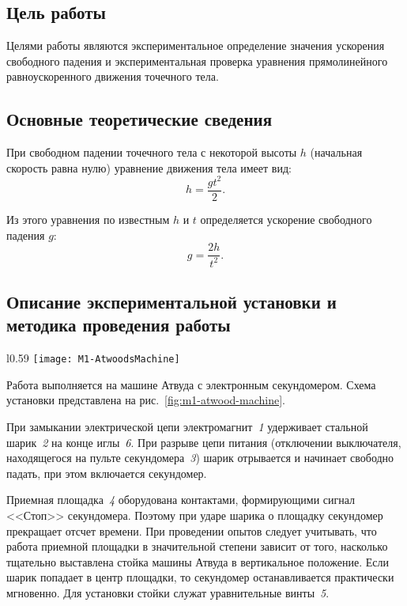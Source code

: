\documentclass[a4paper, 12pt]{extarticle}
\begin{document}
\MTDTitlePage
\MTDInfoPage

\setcounter{section}{1}

\subsection{Цель работы}
Целями работы являются экспериментальное определение значения ускорения свободного падения и экспериментальная проверка уравнения прямолинейного равноускоренного движения точечного тела.

\subsection{Основные теоретические сведения}
При свободном падении точечного тела с некоторой высоты $h$ (начальная скорость равна нулю) уравнение движения тела имеет вид: %
\begin{equation}
\label{eq:m1-free-fall-h}
h = \frac{gt^2}{2}.
\end{equation}

Из этого уравнения по известным $h$ и $t$ определяется ускорение свободного падения $g$: %
\begin{equation}
\label{eq:m1-free-fall-g}
g = \frac{2h}{t^2}.
\end{equation}

\subsection{Описание экспериментальной установки и методика проведения работы}
\begin{wrapfigure}{l}{0.59\textwidth} 
\centering
\texttt{[image: M1-AtwoodsMachine]}
\caption{Схема экспериментальной установки \label{fig:m1-atwood-machine}}
\end{wrapfigure}
Работа выполняется на машине Атвуда с электронным секундомером. Схема установки представлена на рис.~\ref{fig:m1-atwood-machine}.

При замыкании электрической цепи электромагнит~\emph{1} удерживает стальной шарик~\emph{2} на конце иглы~\emph{6}. При разрыве цепи питания (отключении выключателя, находящегося на пульте секундомера~\emph{3}) шарик отрывается и начинает свободно падать, при этом включается секундомер. %

Приемная площадка~\emph{4} оборудована контактами, формирующими сигнал <<Стоп>> секундомера. Поэтому при ударе шарика о площадку секундомер прекращает отсчет времени. При проведении опытов следует учитывать, что работа приемной площадки в значительной степени зависит от того, насколько тщательно выставлена стойка машины Атвуда в вертикальное положение. Если шарик попадает в центр площадки, то секундомер останавливается практически мгновенно. Для установки стойки служат уравнительные винты~\emph{5}. %
\end{document}
